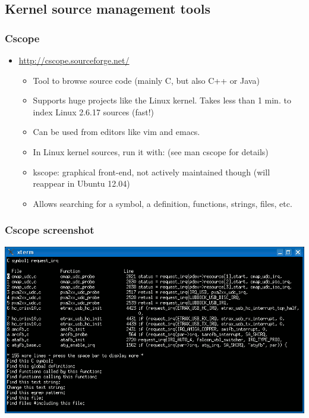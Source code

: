 \subsection{Kernel source management tools}

\begin{frame}
  \frametitle{Cscope}
  \begin{itemize}
  \item \url{http://cscope.sourceforge.net/}
    \begin{itemize}
    \item Tool to browse source code (mainly C, but also C++ or Java)
    \item Supports huge projects like the Linux kernel. Takes less
      than 1 min. to index Linux 2.6.17 sources (fast!)
    \item Can be used from editors like vim and emacs.
    \item In Linux kernel sources, run it with:  (see
      man cscope for details)
    \item kscope: graphical front-end, not actively maintained though
      (will reappear in Ubuntu 12.04)
    \item Allows searching for a symbol, a definition, functions,
      strings, files, etc.
    \end{itemize}
  \end{itemize}
\end{frame}

\begin{frame}
  \frametitle{Cscope screenshot}
  \begin{center}
    \includegraphics[width=\textwidth]{slides/kernel-source-code-management/cscope.png}
  \end{center}
\end{frame}

